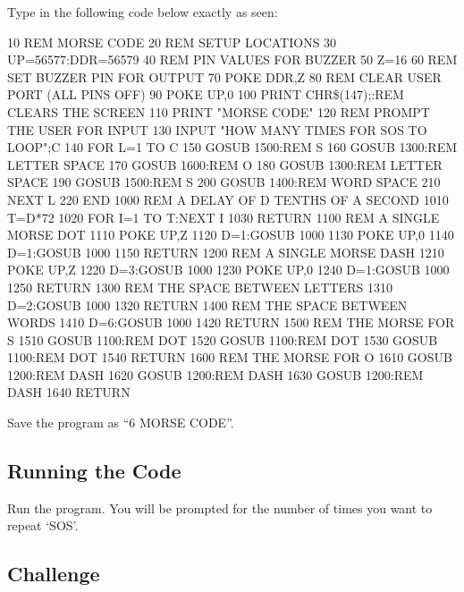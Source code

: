 Type in the following code below exactly as seen:
\begin{basic}
10 REM MORSE CODE
20 REM SETUP LOCATIONS
30 UP=56577:DDR=56579
40 REM PIN VALUES FOR BUZZER
50 Z=16
60 REM SET BUZZER PIN FOR OUTPUT
70 POKE DDR,Z
80 REM CLEAR USER PORT (ALL PINS OFF)
90 POKE UP,0
100 PRINT CHR\$(147);:REM CLEARS THE SCREEN
110 PRINT "MORSE CODE"
120 REM PROMPT THE USER FOR INPUT
130 INPUT "HOW MANY TIMES FOR SOS TO LOOP";C
140 FOR L=1 TO C
150 GOSUB 1500:REM S
160 GOSUB 1300:REM LETTER SPACE
170 GOSUB 1600:REM O
180 GOSUB 1300:REM LETTER SPACE
190 GOSUB 1500:REM S
200 GOSUB 1400:REM WORD SPACE
210 NEXT L
220 END
1000 REM A DELAY OF D TENTHS OF A SECOND
1010 T=D*72
1020 FOR I=1 TO T:NEXT I
1030 RETURN
1100 REM A SINGLE MORSE DOT
1110 POKE UP,Z
1120 D=1:GOSUB 1000
1130 POKE UP,0
1140 D=1:GOSUB 1000
1150 RETURN
1200 REM A SINGLE MORSE DASH
1210 POKE UP,Z
1220 D=3:GOSUB 1000
1230 POKE UP,0
1240 D=1:GOSUB 1000
1250 RETURN
1300 REM THE SPACE BETWEEN LETTERS
1310 D=2:GOSUB 1000
1320 RETURN
1400 REM THE SPACE BETWEEN WORDS
1410 D=6:GOSUB 1000
1420 RETURN
1500 REM THE MORSE FOR S
1510 GOSUB 1100:REM DOT
1520 GOSUB 1100:REM DOT
1530 GOSUB 1100:REM DOT
1540 RETURN
1600 REM THE MORSE FOR O
1610 GOSUB 1200:REM DASH
1620 GOSUB 1200:REM DASH
1630 GOSUB 1200:REM DASH
1640 RETURN
\end{basic}

Save the program as ``6 MORSE CODE''.

\subsection*{Running the Code}

Run the program.  You will be prompted for the number of times you want to repeat `SOS'.

\subsection*{Challenge}

